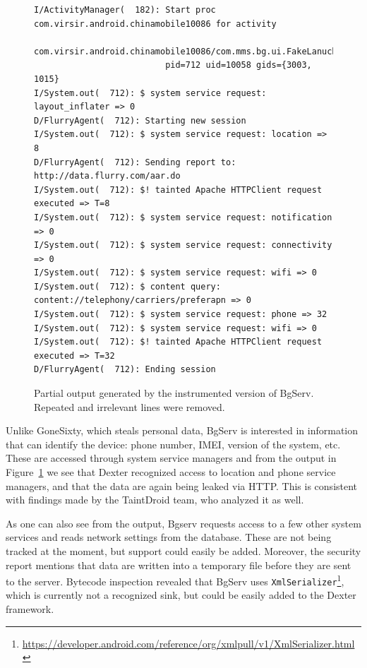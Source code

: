 \documentclass[12pt,twoside,notitlepage]{report}
\newcommand{\weblink}[1] {\footnote{\scriptsize\url{#1}}}
\begin{document}
\begin{figure}[t]
	\scriptsize
	\begin{verbatim}
I/ActivityManager(  182): Start proc com.virsir.android.chinamobile10086 for activity 
                          com.virsir.android.chinamobile10086/com.mms.bg.ui.FakeLanucherActivity: 
                          pid=712 uid=10058 gids={3003, 1015}
I/System.out(  712): $ system service request: layout_inflater => 0
D/FlurryAgent(  712): Starting new session
I/System.out(  712): $ system service request: location => 8
D/FlurryAgent(  712): Sending report to: http://data.flurry.com/aar.do
I/System.out(  712): $! tainted Apache HTTPClient request executed => T=8
I/System.out(  712): $ system service request: notification => 0
I/System.out(  712): $ system service request: connectivity => 0
I/System.out(  712): $ system service request: wifi => 0
I/System.out(  712): $ content query: content://telephony/carriers/preferapn => 0
I/System.out(  712): $ system service request: phone => 32
I/System.out(  712): $ system service request: wifi => 0
I/System.out(  712): $! tainted Apache HTTPClient request executed => T=32
D/FlurryAgent(  712): Ending session
	\end{verbatim}
	\caption{Partial output generated by the instrumented version of BgServ. Repeated and irrelevant lines were removed.}
	\label{figure:Evaluation_BgServ}
\end{figure}

Unlike GoneSixty, which steals personal data, BgServ is interested in information that can identify the device: phone number, IMEI, version of the system, etc. These are accessed through system service managers and from the output in Figure~\ref{figure:Evaluation_BgServ} we see that Dexter recognized access to location and phone service managers, and that the data are again being leaked via HTTP. This is consistent with findings made by the TaintDroid team, who analyzed it as well.

As one can also see from the output, Bgserv requests access to a few other system services and reads network settings from the database. These are not being tracked at the moment, but support could easily be added. Moreover, the security report mentions that data are written into a temporary file before they are sent to the server. Bytecode inspection revealed that BgServ uses \verb$XmlSerializer$\weblink{https://developer.android.com/reference/org/xmlpull/v1/XmlSerializer.html}, which is currently not a recognized sink, but could be easily added to the Dexter framework.
\end{document}
